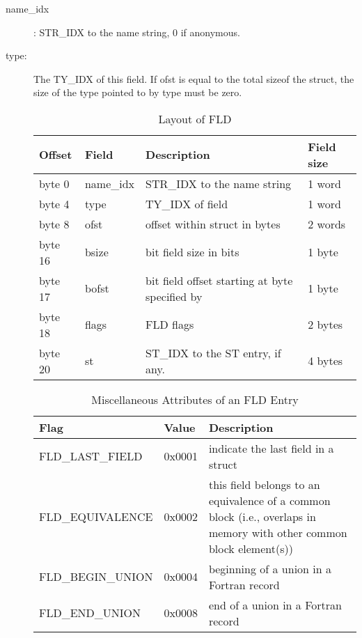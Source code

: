 \begin{description}
\item[name\_idx]:
%
STR\_IDX to the name string, 0 if anonymous.

\item[type:]
The
%
TY\_IDX of this field. If ofst is equal to the total sizeof the
  struct, the size of the type pointed to by type must be zero.

\begin{table}
\centering
\caption{Layout of FLD} 
\begin{tabular}{|l|l|l|l|}\hline
Offset & Field & Description & Field size \\\hline\hline
byte 0 & name\_idx &
\index{STR\_IDX}%
STR\_IDX to the name string & 1 word \\\hline
byte 4 & type &
\index{TY\_IDX}%
TY\_IDX of field & 1 word \\\hline
byte 8 & ofst & offset within struct in bytes & 2 words \\\hline
byte 16 & bsize & bit field size in bits & 1 byte \\\hline
byte 17 & bofst & bit field offset starting at byte specified by & 1 byte \\\hline
byte 18 & flags &
\index{FLD}%
FLD flags & 2 bytes \\\hline
byte 20 & st &
\index{ST\_IDX}%
ST\_IDX to the
\index{ST}%
ST entry, if any. & 4 bytes\\\hline
\end{tabular}
\end{table}

\begin{table}
\centering
\caption{Miscellaneous Attributes of an
%
FLD Entry}
\label{table22} 
\begin{tabular}{|l|l|p{3in}|}\hline
Flag & Value & Description \\\hline\hline
\index{FLD\_LAST\_FIELD}%
FLD\_LAST\_FIELD & 0x0001 & indicate the last field in a
struct\\\hline

\index{FLD\_EQUIVALENCE}%
FLD\_EQUIVALENCE & 0x0002 & this field belongs to an equivalence of a
common block (i.e., overlaps in memory with other common block
element(s))\\\hline

\index{FLD\_BEGIN\_UNION}%
FLD\_BEGIN\_UNION & 0x0004 & beginning of a union in a Fortran record\\\hline

\index{FLD\_END\_UNION}%
FLD\_END\_UNION & 0x0008 & end of a union in a Fortran record \\\hline


\end{tabular}
\end{table}
\end{description}
